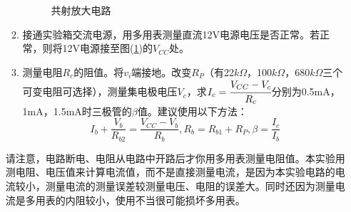 \documentclass[a4paper]{article}
\begin{document}
\begin{enumerate}
\begin{enumerate}
\begin{figure}[!h]
\begin{center}
\end{center}
\caption{共射放大电路}\label{fig1}
\end{figure}
\item 接通实验箱交流电源，用多用表测量直流12V电源电压是否正常。若正常，则将12V电源接至图(\ref{fig1})的$V_{CC}$处。
\item 测量电阻$R_c$的阻值。将$v_i$端接地。改变$R_P$（有22$k\Omega$，100$k\Omega$，680$k\Omega$三个可变电阻可选择），测量集电极电压$V_c$，求$I_c = \cfrac{V_{CC}-V_{c}}{R_c}$分别为0.5mA，1mA，1.5mA时三极管的$\beta$值。建议使用以下方法：
\begin{equation}
I_b + \frac{V_b}{R_{b2}} = \frac{V_{CC} - V_b}{R_b}, R_b = R_{b1} + R_P, \beta = \frac{I_c}{I_b}
\end{equation}
\end{enumerate}
请注意，电路断电、电阻从电路中开路后才你用多用表测量电阻值。本实验用测电阻、电压值来计算电流值，而不是直接测量电流，是因为本实验电路的电流较小，测量电流的测量误差较测量电压、电阻的误差大。同时还因为测量电流是多用表的内阻较小，使用不当很可能损坏多用表。


\end{enumerate}
\end{document}
